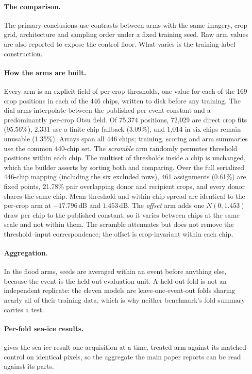\documentclass[10pt,twocolumn,letterpaper]{article}
\begin{document}
\paragraph{The comparison.} The primary conclusions use contrasts between arms with
the same imagery, crop grid, architecture and sampling order under a fixed training
seed. Raw arm values are also reported to expose the control floor. What varies is
the training-label construction.

\paragraph{How the arms are built.} Every arm is an explicit field of per-crop
thresholds, one value for each of the $169$ crop positions in each of the 446 chips,
written to disk before any training. The dial arms interpolate between the published
per-event constant and a predominantly per-crop Otsu field. Of 75{,}374 positions,
72{,}029 are direct crop fits (95.56\%), 2{,}331 use a finite chip fallback
(3.09\%), and 1{,}014 in six chips remain unusable (1.35\%). Arrays span all 446
chips; training, scoring and arm summaries use the common 440-chip set. The \emph{scramble}
arm randomly permutes threshold positions within each chip. The multiset of
thresholds inside a chip is unchanged, which the builder asserts by sorting both and
comparing. Over the full serialized 446-chip mapping (including the six excluded
rows), 461 assignments (0.61\%) are fixed points, 21.78\% pair overlapping donor
and recipient crops, and every donor shares the same chip. Mean threshold and
within-chip spread are identical to the per-crop arm at $-17.796$\,dB and
$1.453$\,dB. The \emph{offset} arm adds one $N(0, 1.453)$ draw per chip to the
published constant, so it varies between chips at the same scale and not within them.
The scramble attenuates but does not remove the threshold--input correspondence; the
offset is crop-invariant within each chip.

\paragraph{Aggregation.} In the flood arms, seeds are averaged within an event
before anything else, because the event is the held-out evaluation unit. A held-out
fold is not an independent replicate: the eleven models are leave-one-event-out folds sharing nearly all of
their training data, which is why neither benchmark's fold summary carries a test.

\paragraph{Per-fold sea-ice results.}  gives the sea-ice result
one acquisition at a time, treated arm against its matched control on identical
pixels, so the aggregate the main paper reports can be read against its parts.
\end{document}
